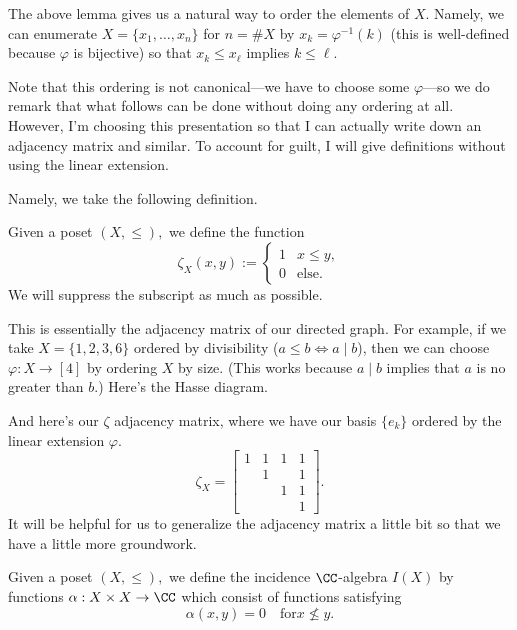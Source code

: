 The above lemma gives us a natural way to order the elements of $X.$ Namely, we can enumerate $X=\{x_1,\ldots,x_n\}$ for $n=\#X$ by $x_k=\varphi^{-1}(k)$ (this is well-defined because $\varphi$ is bijective) so that $x_k\le x_\ell$ implies $k\le\ell.$

Note that this ordering is not canonical---we have to choose some $\varphi$---so we do remark that what follows can be done without doing any ordering at all. However, I'm choosing this presentation so that I can actually write down an adjacency matrix and similar. To account for guilt, I will give definitions without using the linear extension.

Namely, we take the following definition.
\begin{definition}
    Given a poset $(X,\le),$ we define the function
    \[\zeta_X(x,y):=\begin{cases}
        1 & x\le y, \\
        0 & \text{else}.
    \end{cases}\]
    We will suppress the subscript as much as possible.
\end{definition}
This is essentially the adjacency matrix of our directed graph. For example, if we take $X=\{1,2,3,6\}$ ordered by divisibility ($a\le b\iff a\mid b$), then we can choose $\varphi:X\to[4]$ by ordering $X$ by size. (This works because $a\mid b$ implies that $a$ is no greater than $b.$) Here's the Hasse diagram.
\begin{center}
\end{center}
And here's our $\zeta$ adjacency matrix, where we have our basis $\{e_k\}$ ordered by the linear extension $\varphi.$
\[\zeta_X=\begin{bmatrix}
    1 & 1 & 1 & 1 \\
      & 1 &   & 1 \\
      &   & 1 & 1 \\
      &   &   & 1
\end{bmatrix}.\]
It will be helpful for us to generalize the adjacency matrix a little bit so that we have a little more groundwork.
\begin{definition}
    Given a poset $(X,\le),$ we define the incidence $\CC$-algebra $I(X)$ by functions $\alpha:X\times X\to\CC$ which consist of functions satisfying
    \[\alpha(x,y)=0\quad\text{for}x\not\le y.\]
\end{definition}
